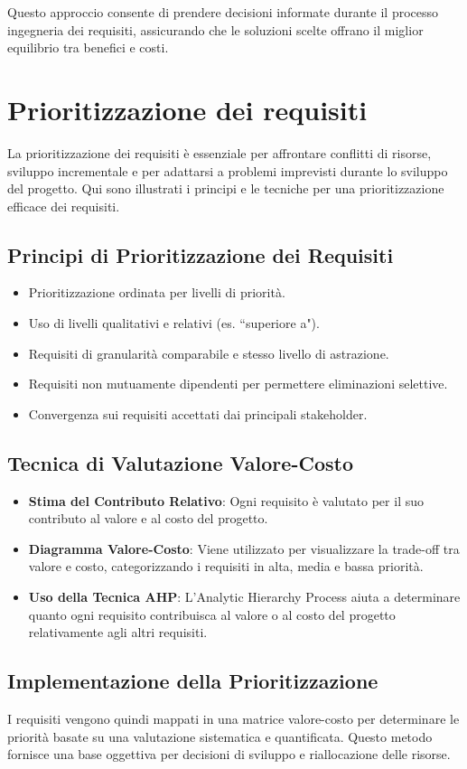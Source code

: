 Questo approccio consente di prendere decisioni informate durante il processo 
ingegneria dei requisiti, assicurando che le soluzioni scelte offrano il miglior 
equilibrio tra 
benefici e costi.

\section{Prioritizzazione dei requisiti}
La prioritizzazione dei requisiti è essenziale per affrontare conflitti di risorse,
sviluppo incrementale e per adattarsi a problemi imprevisti durante lo sviluppo
del progetto. Qui sono illustrati i principi e le tecniche per una prioritizzazione
efficace dei requisiti.

\subsection{Principi di Prioritizzazione dei Requisiti}
\begin{itemize}
    \item Prioritizzazione ordinata per livelli di priorità.
    \item Uso di livelli qualitativi e relativi (es. ``superiore a").
    \item Requisiti di granularità comparabile e stesso livello di astrazione.
    \item Requisiti non mutuamente dipendenti per permettere eliminazioni selettive.
    \item Convergenza sui requisiti accettati dai principali stakeholder.
\end{itemize}

\subsection{Tecnica di Valutazione Valore-Costo}
\begin{itemize}
    \item \textbf{Stima del Contributo Relativo}: Ogni requisito è valutato per il
    suo contributo al valore e al costo del progetto.
    \item \textbf{Diagramma Valore-Costo}: Viene utilizzato per visualizzare la
    trade-off tra valore e costo, categorizzando i requisiti in alta, media e bassa priorità.
    \item \textbf{Uso della Tecnica AHP}: L'Analytic Hierarchy Process aiuta a
    determinare quanto ogni requisito contribuisca al valore o al costo del
    progetto relativamente agli altri requisiti.
\end{itemize}

\subsection{Implementazione della Prioritizzazione}
I requisiti vengono quindi mappati in una matrice valore-costo per determinare
le priorità basate su una valutazione sistematica e quantificata. Questo metodo
fornisce una base oggettiva per decisioni di sviluppo e riallocazione delle risorse.
